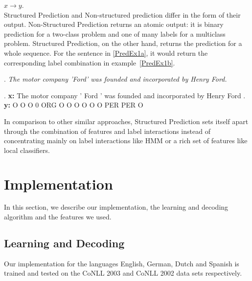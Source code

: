 \documentclass[11pt]{article}
\begin{document}
$ x \rightarrow y $. \\

Structured Prediction and Non-structured prediction differ in the form of their output.
Non-Structured Prediction returns an atomic output: it is binary prediction for a two-class problem and one of many labels for a multiclass problem. 
Structured Prediction, on the other hand, returns the prediction for a whole sequence. 
For the sentence in \ref{PredEx1a}, it would return the corresponding label combination in example~\ref{PredEx1b}. 

\begin{figure*}[ht]



\ex. \emph{The motor company 'Ford' was founded and incorporated  by Henry Ford.} \label{PredEx1a}
 
\exg. \textbf{x:} The motor company ' Ford ' was founded and incorporated by Henry Ford .\\
      \textbf{y:}  O   O      O     0 ORG  O  O     O     O       O        O PER   PER  O  \label{PredEx1b} \\


\caption{Input and predicted structure for the Named Entity Recognition task.}

\end{figure*}

In comparison to other similar approaches, Structured Prediction sets itself apart through the combination of features and label interactions instead
of concentrating mainly on label interactions like HMM or a rich set of features like local classifiers. 

\section{Implementation}
In this section, we describe our implementation, the learning and decoding algorithm and the features we used.


\subsection{Learning and Decoding}

Our implementation for the languages English, German, Dutch and Spanish is trained and tested on the CoNLL 2003 and CoNLL 2002 data sets respectively. 
\end{document}

